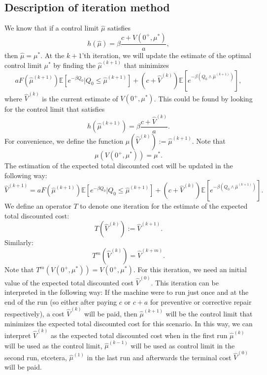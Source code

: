 \subsection{Description of iteration method}\label{section:AgeBasedIterationDescription}
We know that if a control limit $\hat{\mu}$ satisfies
\[h(\hat{\mu})=\beta\frac{c+V(0^+,\mu^*)}{a},\]
then $\hat{\mu}=\mu^*$.
At the $k+1$'th iteration, we will update the estimate of the optimal control limit $\mu^*$ by finding the $\hat{\mu}^{(k+1)}$ that minimizes
\[
aF(\hat{\mu}^{(k+1)})\mathbb{E}[e^{-\beta Q_0}|Q_0\leq \hat{\mu}^{(k+1)}]+(c+\hat{V}^{(k)})\mathbb{E}[e^{-\beta(Q_0\wedge\hat{\mu}^{(k+1)})}],
\]
where $\hat{V}^{(k)}$ is the current estimate of $V(0^+,\mu^*)$.
This could be found by looking for the control limit that satisfies
\begin{equation}\label{eq:AgeBasedIterationBound}
h(\hat{\mu}^{(k+1)})=\beta\frac{c+\hat{V}^{(k)}}{a}.\end{equation}
For convenience, we define the function $\mu(\hat{V}^{(k)}):=\hat{\mu}^{(k+1)}$.
Note that 
\begin{equation}\label{eq:AgeBasedIterationControlConvergence}
\mu(V(0^+,\mu^*))=\mu^*.
\end{equation}
The estimation of the expected total discounted cost will be updated in the following way:
\[\hat{V}^{(k+1)}=aF(\hat{\mu}^{(k+1)})\mathbb{E}[e^{-\beta Q_0}|Q_0\leq \hat{\mu}^{(k+1)}]+(c+\hat{V}^{(k)})\mathbb{E}[e^{-\beta(Q_0\wedge\hat{\mu}^{(k+1)})}].\]
We define an operator $T$ to denote one iteration for the estimate of the expected total discounted cost:
\[T(\hat{V}^{(k)}):=\hat{V}^{(k+1)}.\]
Similarly:
\[T^m(\hat{V}^{(k)})=\hat{V}^{(k+m)}.\]
Note that $T^m(V(0^+,\mu^*))=V(0^+,\mu^*)$.
For this iteration, we need an initial value of the expected total discounted cost $\hat{V}^{(0)}$.
This iteration can be interpreted in the following way:
If the machine were to run just once and at the end of the run (so either after paying $c$ or $c+a$ for preventive or corrective repair respectively), a cost $\hat{V}^{(k)}$ will be paid, then $\hat{\mu}^{(k+1)}$ will be the control limit that minimizes the expected total discounted cost for this scenario.
In this way, we can interpret $\hat{V}^{(k)}$ as the expected total discounted cost when in the first run $\hat{\mu}^{(k)}$ will be used as the control limit, $\hat{\mu}^{(k-1)}$ will be used as control limit in the second run, etcetera, $\hat{\mu}^{(1)}$ in the last run and afterwards the terminal cost $\hat{V}^{(0)}$ will be paid.

